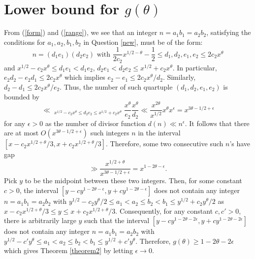 \documentclass{article}
\begin{document}
\section{Lower bound for $g(\theta)$}
From (\ref{form}) and (\ref{range}), we see that an integer $n = a_1 b_1 = a_2 b_2$, satisfying the conditions for $a_1, a_2, b_1, b_2$ in Question \ref{new}, must be of the form:
$$n = (d_1 e_1) (d_2 e_2) \mbox{ with } \frac{1}{2c_2} x^{1/2 - \theta} - \frac{1}{2} \leq d_1, d_2, e_1, e_2 \leq 2c_2 x^\theta$$
and $x^{1/2} - c_2 x^\theta \leq d_1 e_1 < d_1 e_2, \, d_2 e_1 < d_2 e_2 \leq x^{1/2} + c_2 x^\theta$. In particular, $e_2 d_2 - e_2 d_1 \leq 2c_2 x^\theta$ which implies $e_2 - e_1 \leq 2c_2 x^\theta / d_2$. Similarly, $d_2 - d_1 \leq 2c_2 x^\theta / e_2$. Thus, the number of such quartuple $(d_1, d_2, e_1, e_2)$ is bounded by
$$\ll \mathop{\sum_{x^{1/2 - \theta} \ll d_2, e_2 \ll x^\theta}}_{x^{1/2} - c_2 x^\theta \leq d_2 e_2 \leq x^{1/2} + c_2 x^\theta} \frac{x^\theta}{e_2} \frac{x^\theta}{d_2} \ll \frac{x^{2\theta}}{x^{1/2}} x^\theta x^\epsilon = x^{3\theta - 1/2 + \epsilon}$$
for any $\epsilon > 0$ as the number of divisor function $d(n) \ll n^\epsilon$. It follows that there are at most $O(x^{3\theta - 1/2 + \epsilon})$ such integers $n$ in the interval $[x - c_2 x^{1/2+\theta}/3, x + c_2 x^{1/2+\theta}/3]$. Therefore, some two consecutive such $n$'s have gap
$$\gg \frac{x^{1/2 + \theta}}{x^{3\theta - 1/2 + \epsilon}} = x^{1 - 2\theta - \epsilon}.$$
Pick $y$ to be the midpoint between these two integers. Then, for some constant $c > 0$, the interval $[y - c y^{1-2\theta-\epsilon}, y + c y^{1-2\theta-\epsilon}]$ does not contain any integer $n = a_1 b_1 = a_2 b_2$ with $y^{1/2} - c_2 y^\theta/2 \leq a_1 < a_2 \leq b_2 < b_1 \leq y^{1/2} + c_2 y^\theta/2$ as $x - c_2 x^{1/2 + \theta}/3 \leq y \leq x + c_2 x^{1/2 + \theta}/3$. Consequently, for any constant $c, c' > 0$, there is arbitrarily large $y$ such that the interval $[y - c y^{1-2\theta-2\epsilon}, y + c y^{1-2\theta-2\epsilon}]$ does not contain any integer $n = a_1 b_1 = a_2 b_2$ with $y^{1/2} - c' y^\theta \leq a_1 < a_2 \leq b_2 < b_1 \leq y^{1/2} + c' y^\theta$. Therefore, $g(\theta) \geq 1 - 2\theta - 2\epsilon$ which gives Theorem \ref{theorem2} by letting $\epsilon \rightarrow 0$.

\end{document}
